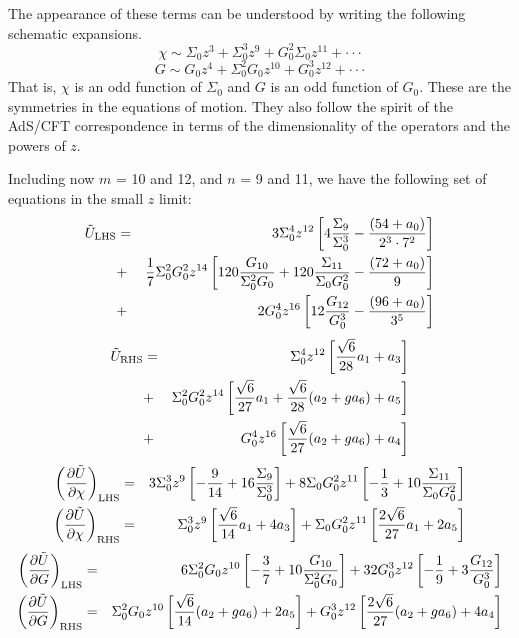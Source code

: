 \documentclass[12pt]{article}
\newcommand{\ba}{\begin{eqnarray}}
\newcommand{\ea}{\end{eqnarray}}
\newcommand{\bd}{\begin{displaymath}}
\newcommand{\ed}{\end{displaymath}}
\def\rt6{\sqrt{6}}
\begin{document}
The appearance of these terms can be understood by writing the following schematic expansions.
\bd
\chi \sim \Sigma_0 z^3 + \Sigma_0^3 z^9 + G_0^2 \Sigma_0 z^{11} + \cdot\cdot\cdot
\ed
\bd
G \sim G_0 z^4 + \Sigma_0^2 G_0 z^{10} + G_0^3 z^{12} + \cdot\cdot\cdot
\ed
That is, $\chi$ is an odd function of $\Sigma_0$ and $G$ is an odd function of $G_0$.  
These are the symmetries in the equations of motion.  
They also follow the spirit of the AdS/CFT correspondence in terms of the dimensionality of the operators and the powers of $z$.

Including now $m$ = 10 and 12, and $n$ = 9 and 11, we have the following set of equations in the small $z$ limit:
\ba
\tilde{U}_{\rm LHS} &=& 3 \Sigma_0^4 z^{12} \left[ 4 \frac{\Sigma_9}{\Sigma_0^3} - \frac{(54+a_0)}{2^3 \cdot 7^2} \right] \nonumber \\
&+& \frac{1}{7} \Sigma_0^2 G_0^2 z^{14} \left[ 120 \frac{G_{10}}{\Sigma_0^2 G_0} + 120 \frac{\Sigma_{11}}{\Sigma_0 G_0^2} - \frac{(72+a_0)}{9} \right] \nonumber \\
&+& 2G_0^4 z^{16} \left[ 12 \frac{G_{12}}{G_0^3} - \frac{(96+a_0)}{3^5} \right]
\ea
\ba
\tilde{U}_{\rm RHS} &=& \Sigma_0^4 z^{12} \left[  \frac{\rt6}{28} a_1 + a_3\right] \nonumber \\
&+& \Sigma_0^2 G_0^2 z^{14} \left[ \frac{\rt6}{27} a_1 + \frac{\rt6}{28} (a_2 + g a_6) + a_5 \right] \nonumber \\
&+& G_0^4 z^{16} \left[ \frac{\rt6}{27} (a_2 + g a_6) + a_4 \right]
\ea
\ba
\left(\frac{\partial \tilde{U}}{\partial \chi}\right)_{\rm LHS} &=& 3 \Sigma_0^3 z^9 \left[ -\frac{9}{14} + 16 \frac{\Sigma_9}{\Sigma_0^3} \right]+ 8 \Sigma_0 G_0^2 z^{11} \left[ - \frac{1}{3} + 10 \frac{\Sigma_{11}}{\Sigma_0 G_0^2} \right]\\
\left(\frac{\partial \tilde{U}}{\partial \chi}\right)_{\rm RHS} &=& \Sigma_0^3 z^9 \left[ \frac{\rt6}{14} a_1 + 4 a_3  \right]+ \Sigma_0 G_0^2 z^{11} \left[  \frac{2\rt6}{27} a_1 + 2 a_5 \right]
\ea
\ba
\left(\frac{\partial \tilde{U}}{\partial G}\right)_{\rm LHS} &=& 6 \Sigma_0^2 G_0 z^{10} \left[ -\frac{3}{7} + 10 \frac{G_{10}}{\Sigma_0^2 G_0} \right]
+ 32 G_0^3 z^{12} \left[ - \frac{1}{9} + 3 \frac{G_{12}}{G_0^3} \right] \\
\left(\frac{\partial \tilde{U}}{\partial G}\right)_{\rm RHS} &=& \Sigma_0^2 G_0 z^{10} \left[ \frac{\rt6}{14} (a_2 + g a_6) + 2a_5 \right]
+ G_0^3 z^{12} \left[ \frac{2\rt6}{27}  (a_2 + g a_6) + 4a_4 \right]
\ea
\end{document}
